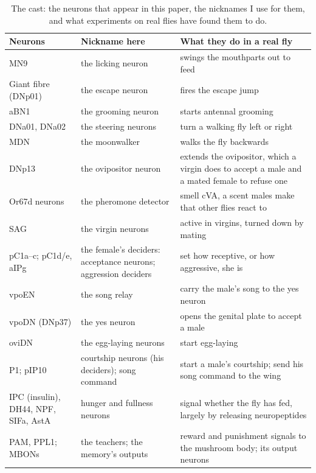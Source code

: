 \documentclass[11pt,a4paper]{article}
\begin{document}
\begin{table}[tbp]
\centering
\small
\renewcommand{\arraystretch}{1.1}
\begin{tabularx}{\textwidth}{@{}>{\RaggedRight}p{3.3cm}>{\RaggedRight}p{3.2cm}>{\RaggedRight\arraybackslash}X@{}}
\toprule
\textbf{Neurons} & \textbf{Nickname here} & \textbf{What they do in a real fly} \\
\midrule
MN9 & the licking neuron & swings the mouthparts out to feed \citep{shiu2024drosophila} \\
Giant fibre (DNp01) & the escape neuron & fires the escape jump \citep{vonreyn2014spike} \\
aBN1 & the grooming neuron & starts antennal grooming \citep{hampel2015neural} \\
DNa01, DNa02 & the steering neurons & turn a walking fly left or right \citep{rayshubskiy2025neural} \\
MDN & the moonwalker & walks the fly backwards \citep{bidaye2014neuronal} \\
DNp13 & the ovipositor neuron & extends the ovipositor, which a virgin does to accept a male and a mated female to refuse one \citep{mezzera2020ovipositor} \\
Or67d neurons & the pheromone detector & smell cVA, a scent males make that other flies react to \citep{kurtovic2007single} \\
SAG & the virgin neurons & active in virgins, turned down by mating \citep{feng2014ascending} \\
pC1a--c; pC1d/e, aIPg & the female's deciders: acceptance neurons; aggression deciders & set how receptive, or how aggressive, she is \citep{wang2021neural,deutsch2020neural,schretter2020cell} \\
vpoEN & the song relay & carry the male's song to the yes neuron \citep{wang2021neural} \\
vpoDN (DNp37) & the yes neuron & opens the genital plate to accept a male \citep{wang2021neural} \\
oviDN & the egg-laying neurons & start egg-laying \citep{wang2020neural} \\
P1; pIP10 & courtship neurons (his deciders); song command & start a male's courtship; send his song command to the wing \citep{vonphilipsborn2011neuronal,kohatsu2011female} \\
IPC (insulin), DH44, NPF, SIFa, AstA & hunger and fullness neurons & signal whether the fly has fed, largely by releasing neuropeptides \citep{pool2014feeding} \\
PAM, PPL1; MBONs & the teachers; the memory's outputs & reward and punishment signals to the mushroom body; its output neurons \citep{aso2014neuronal} \\
\bottomrule
\end{tabularx}
\caption{The cast: the neurons that appear in this paper, the nicknames I use for them, and what experiments on real flies have found them to do.}
\label{tab:cast}
\end{table}
\end{document}
